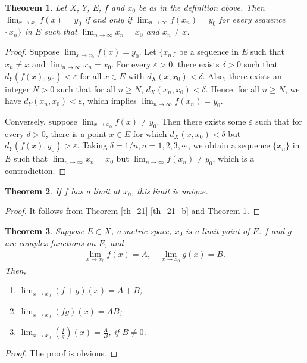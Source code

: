 \documentclass[11pt]{book}
\newtheorem{theorem}{Theorem}[chapter]
\theoremstyle{definition}
\numberwithin{equation}{chapter}
\begin{document}
\begin{theorem}\label{th_31}
Let $X$, $Y$, $E$, $f$ and $x_0$ be as in the definition above. Then $\lim_{x \to x_0} f(x) = y_0$ if and only if $\lim_{n \to \infty} f(x_n) = y_0$ for every sequence $\{x_n\}$ in $E$ such that $\lim_{n\to\infty} x_n = x_0$ and $x_n \neq x$.
\end{theorem}
\begin{proof}
Suppose $\lim_{x \to x_0} f(x) = y_0$. Let $\{x_n\}$ be a sequence in $E$ such that $x_n \neq x$ and $\lim_{n\to\infty} x_n = x_0$. For every $\varepsilon > 0$, there exists $\delta > 0$ such that $d_Y(f(x),y_0) < \varepsilon$ for all $x \in E$ with $d_X(x,x_0) < \delta$. Also, there exists an integer $N > 0$ such that for all $n \geq N$, $d_X(x_n,x_0) < \delta$. Hence, for all $n \geq N$, we have $d_Y(x_n,x_0) < \varepsilon$, which implies $\lim_{n \to \infty} f(x_n) = y_0$.

Conversely, suppose $\lim_{x \to x_0} f(x) \neq y_0$. Then there exists some $\varepsilon$ such that for every $\delta > 0$, there is a point $x \in E$ for which $d_X(x,x_0) < \delta$ but $d_Y(f(x),y_0) > \varepsilon$. Taking $\delta = 1/n, n = 1,2,3,\cdots$, we obtain a sequence $\{x_n\}$ in $E$ such that $\lim_{n\to\infty} x_n = x_0$ but $\lim_{n\to\infty} f(x_n) \neq y_0$, which is a contradiction.
\end{proof}

\medskip

\begin{theorem}
If $f$ has a limit at $x_0$, this limit is unique. 
\end{theorem}
\begin{proof}
It follows from Theorem \ref{th_21} \ref{th_21_b} and Theorem \ref{th_31}.
\end{proof}

\medskip

\begin{theorem}
Suppose $E \subset X$, a metric space, $x_0$ is a limit point of $E$. $f$ and $g$ are complex functions on $E$, and
\begin{align*}
    \lim_{x\to x_0} f(x) = A, \quad \lim_{x\to x_0} g(x) = B.
\end{align*}
Then,
\begin{enumerate}[label=(\alph*)]
    \item $\lim_{x\to x_0} (f + g)(x) = A + B$;
    
    \item $\lim_{x\to x_0} (fg)(x) = AB$;
    
    \item $\lim_{x\to x_0} \displaystyle \left(\frac{f}{g}\right)(x) = \frac{A}{B}$, if $B \neq 0$.
\end{enumerate}
\end{theorem}
\begin{proof}
The proof is obvious.
\end{proof}
\end{document}

